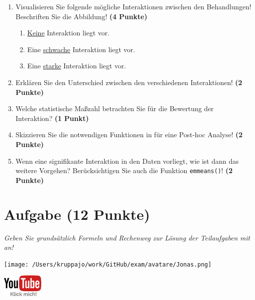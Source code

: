 \documentclass[a4paper, 9pt]{scrartcl}\usepackage[]{graphicx}\usepackage[]{xcolor}
\begin{document}
\begin{enumerate}
\item Visualisieren Sie folgende mögliche Interaktionen zwischen den Behandlungen! Beschriften Sie die Abbildung! \textbf{(4 Punkte)}
\begin{enumerate}
\item \underline{Keine} Interaktion liegt vor.
\item Eine \underline{schwache} Interaktion liegt vor. 
\item Eine \underline{starke} Interaktion liegt vor. 
\end{enumerate}
\item Erklären Sie den Unterschied zwischen den verschiedenen Interaktionen! \textbf{(2 Punkte)}
\item Welche statistische Maßzahl betrachten Sie für die Bewertung der Interaktion? \textbf{(1 Punkt)}
\item Skizzieren Sie die notwendigen Funktionen in \Rlogo für eine Post-hoc Analyse! \textbf{(2 Punkte)} 
\item Wenn eine signifikante Interaktion in den Daten vorliegt, wie ist dann das weitere Vorgehen? Berücksichtigen Sie auch die Funktion \texttt{emmeans()}! \textbf{(2 Punkte)}
\end{enumerate}

 
\clearpage

\section{Aufgabe \hfill (12 Punkte)}

\textit{Geben Sie grundsätzlich Formeln und Rechenweg zur Lösung der Teilaufgaben mit an!} \\[1Ex]
 

 
\ifcollection
\begin{flushright}
\tiny\vspace{-3Ex}
\textbf{\examinhaltstart}
\exammodulebiostat
\vspace{-4Ex}
\end{flushright}
\begin{minipage}[t]{0.5\textwidth}
\texttt{[image: /Users/kruppajo/work/GitHub/exam/avatare/Jonas.png]}
\end{minipage}
\begin{minipage}[t]{0.5\textwidth}
\hfill
\href{https://youtu.be/FjjJXkFJfIY}{\includegraphics[width = 2cm]{img/youtube}}
\end{minipage}
\vspace{-3Ex}
\fi
\end{document}
